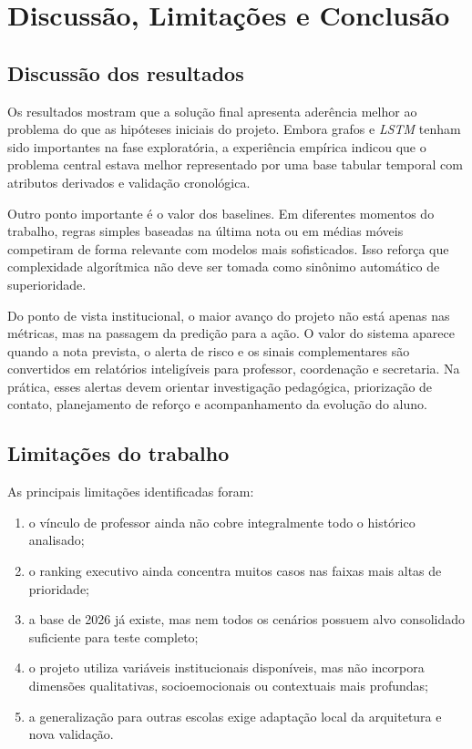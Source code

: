 \chapter{Discuss\~ao, Limita\c{c}\~oes e Conclus\~ao}
\label{cap:conclusao}

\section{Discuss\~ao dos resultados}
\label{sec:discussao}

Os resultados mostram que a solu\c{c}\~ao final apresenta ader\^encia melhor ao problema do que as hip\'oteses iniciais do projeto. Embora grafos e \textit{LSTM} tenham sido importantes na fase explorat\'oria, a experi\^encia emp\'irica indicou que o problema central estava melhor representado por uma base tabular temporal com atributos derivados e valida\c{c}\~ao cronol\'ogica.

Outro ponto importante \'e o valor dos baselines. Em diferentes momentos do trabalho, regras simples baseadas na \'ultima nota ou em m\'edias m\'oveis competiram de forma relevante com modelos mais sofisticados. Isso refor\c{c}a que complexidade algor\'itmica n\~ao deve ser tomada como sin\^onimo autom\'atico de superioridade.

Do ponto de vista institucional, o maior avan\c{c}o do projeto n\~ao est\'a apenas nas m\'etricas, mas na passagem da predi\c{c}\~ao para a a\c{c}\~ao. O valor do sistema aparece quando a nota prevista, o alerta de risco e os sinais complementares s\~ao convertidos em relat\'orios intelig\'iveis para professor, coordena\c{c}\~ao e secretaria. Na pr\'atica, esses alertas devem orientar investiga\c{c}\~ao pedag\'ogica, prioriza\c{c}\~ao de contato, planejamento de refor\c{c}o e acompanhamento da evolu\c{c}\~ao do aluno.

\section{Limita\c{c}\~oes do trabalho}
\label{sec:limitacoes}

As principais limita\c{c}\~oes identificadas foram:

\begin{enumerate}
    \item o v\'inculo de professor ainda n\~ao cobre integralmente todo o hist\'orico analisado;
    \item o ranking executivo ainda concentra muitos casos nas faixas mais altas de prioridade;
    \item a base de 2026 j\'a existe, mas nem todos os cen\'arios possuem alvo consolidado suficiente para teste completo;
    \item o projeto utiliza vari\'aveis institucionais dispon\'iveis, mas n\~ao incorpora dimens\~oes qualitativas, socioemocionais ou contextuais mais profundas;
    \item a generaliza\c{c}\~ao para outras escolas exige adapta\c{c}\~ao local da arquitetura e nova valida\c{c}\~ao.
\end{enumerate}

